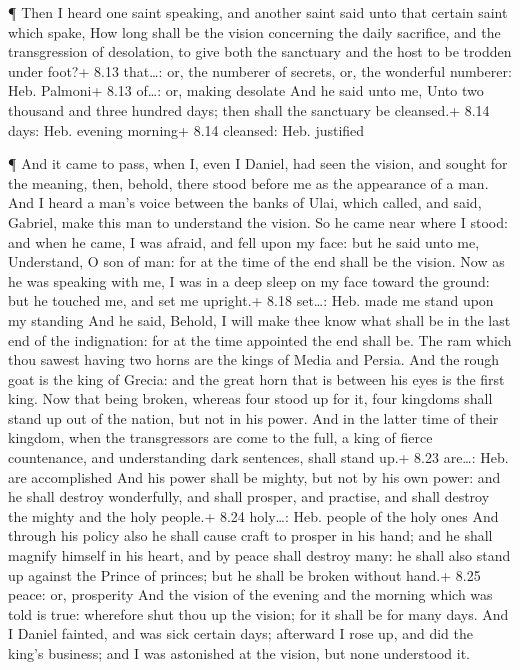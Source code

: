  ¶ Then I heard one saint speaking, and another saint said
unto that certain saint which spake, How long shall be the vision
concerning the daily sacrifice, and the transgression of desolation, to
give both the sanctuary and the host to be trodden under foot?+ 8.13
that\ldots: or, the numberer of secrets, or, the wonderful numberer:
Heb. Palmoni+ 8.13 of\ldots: or, making desolate  And he
said unto me, Unto two thousand and three hundred days; then shall the
sanctuary be cleansed.+ 8.14 days: Heb. evening morning+ 8.14 cleansed:
Heb. justified

 ¶ And it came to pass, when I, even I Daniel, had seen the
vision, and sought for the meaning, then, behold, there stood before me
as the appearance of a man.  And I heard a man's voice
between the banks of Ulai, which called, and said, Gabriel, make this
man to understand the vision.  So he came near where I
stood: and when he came, I was afraid, and fell upon my face: but he
said unto me, Understand, O son of man: for at the time of the end shall
be the vision.  Now as he was speaking with me, I was in a
deep sleep on my face toward the ground: but he touched me, and set me
upright.+ 8.18 set\ldots: Heb. made me stand upon my standing
 And he said, Behold, I will make thee know what shall be
in the last end of the indignation: for at the time appointed the end
shall be.  The ram which thou sawest having two horns are
the kings of Media and Persia.  And the rough goat is the
king of Grecia: and the great horn that is between his eyes is the first
king.  Now that being broken, whereas four stood up for it,
four kingdoms shall stand up out of the nation, but not in his power.
 And in the latter time of their kingdom, when the
transgressors are come to the full, a king of fierce countenance, and
understanding dark sentences, shall stand up.+ 8.23 are\ldots: Heb. are
accomplished  And his power shall be mighty, but not by his
own power: and he shall destroy wonderfully, and shall prosper, and
practise, and shall destroy the mighty and the holy people.+ 8.24
holy\ldots: Heb. people of the holy ones  And through his
policy also he shall cause craft to prosper in his hand; and he shall
magnify himself in his heart, and by peace shall destroy many: he shall
also stand up against the Prince of princes; but he shall be broken
without hand.+ 8.25 peace: or, prosperity  And the vision
of the evening and the morning which was told is true: wherefore shut
thou up the vision; for it shall be for many days.  And I
Daniel fainted, and was sick certain days; afterward I rose up, and did
the king's business; and I was astonished at the vision, but none
understood it.

